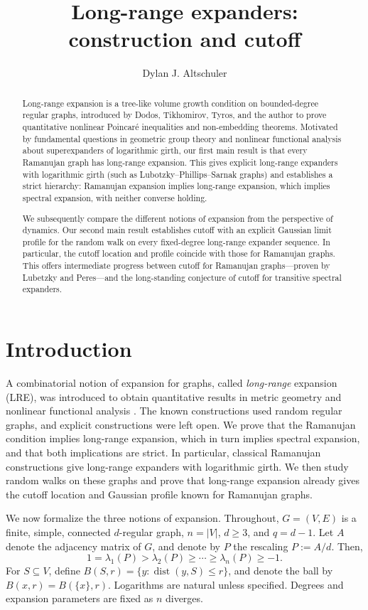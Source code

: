 \documentclass[11pt,reqno]{amsart}
\title{Long-range expanders: construction and cutoff}
\author{Dylan J. Altschuler}
\date{}
\theoremstyle{definition}
\newcommand{\dist}{\operatorname{dist}}
\begin{document}
\begin{abstract}
Long-range expansion is a tree-like volume growth condition on bounded-degree regular graphs, introduced by Dodos, Tikhomirov, Tyros, and the author to prove quantitative nonlinear Poincar\'e inequalities and non-embedding theorems. Motivated by fundamental questions in geometric group theory and nonlinear functional analysis about superexpanders of logarithmic girth, our first main result is that every
Ramanujan graph has long-range expansion. This gives explicit long-range expanders with logarithmic girth (such as Lubotzky--Phillips--Sarnak graphs) and establishes a strict hierarchy: Ramanujan expansion implies long-range expansion, which implies spectral expansion, with neither converse holding.

We subsequently compare the different notions of expansion from the perspective of dynamics. Our second main result establishes cutoff with an explicit Gaussian limit profile for the
random walk on every fixed-degree long-range expander sequence. In particular, the cutoff location and profile coincide with those for Ramanujan
graphs. This offers intermediate progress between cutoff for Ramanujan graphs---proven by Lubetzky and Peres---and the long-standing conjecture of cutoff for transitive spectral expanders. 
\end{abstract}
\maketitle
\section{Introduction}


A combinatorial notion of expansion for graphs, called \emph{long-range}
expansion (LRE), was introduced to obtain quantitative results in metric geometry and nonlinear functional analysis \cite{ADTT,ADTTUniversal}. The known constructions used random regular graphs, and explicit constructions were left open. 
We prove that the Ramanujan condition implies long-range expansion, which in turn implies spectral expansion, and that both implications are strict. In particular, classical Ramanujan constructions give long-range expanders with logarithmic girth. We then study random walks on these graphs and prove that long-range expansion already gives the cutoff location and Gaussian profile known for Ramanujan graphs.

We now formalize the three notions of expansion. Throughout, $G=(V,E)$ is a finite, simple, connected $d$-regular graph,
$n=|V|$, $d\ge3$, and $q=d-1$. Let $A$ denote the adjacency matrix of $G$, and denote by $P$ the rescaling $P := A/d$. Then,
\[
 1=\lambda_1(P)>\lambda_2(P)\ge\cdots\ge\lambda_n(P)\ge-1.
\]
For $S\subseteq V$, define
$B(S,r)=\{y:\dist(y,S)\le r\}$, and denote the ball by $B(x,r)=B(\{x\},r)$. Logarithms are natural unless specified. Degrees and expansion parameters are fixed as $n$ diverges.
\end{document}
